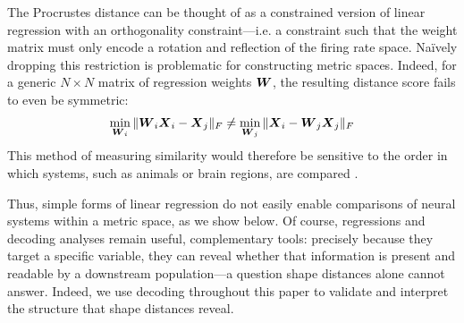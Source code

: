 


The Procrustes distance can be thought of as a constrained version of linear regression with an orthogonality constraint---i.e. a constraint such that the weight matrix must only encode a rotation and reflection of the firing rate space.
Na\"ively dropping this restriction is problematic for constructing metric spaces.
Indeed, for a generic $N \times N$ matrix of regression weights $\boldsymbol{W}$, the resulting distance score fails to even be symmetric:
\begin{equation}
\label{eq:naive-regression}
\min_{\boldsymbol{W}_i} \Vert \boldsymbol{W}_i \boldsymbol{X}_i - \boldsymbol{X}_j \Vert_F \neq \min_{\boldsymbol{W}_j} \Vert \boldsymbol{X}_i - \boldsymbol{W}_j \boldsymbol{X}_j \Vert_F
\end{equation}
This method of measuring similarity would therefore be sensitive to the order in which systems, such as animals or brain regions, are compared \parencite{muzellec2026reverse}.

Thus, simple forms of linear regression do not easily enable comparisons of neural systems within a metric space, as we show below.
Of course, regressions and decoding analyses remain useful, complementary tools: precisely because they target a specific variable, they can reveal whether that information is present and readable by a downstream population—a question shape distances alone cannot answer. Indeed, we use decoding throughout this paper to validate and interpret the structure that shape distances reveal.

